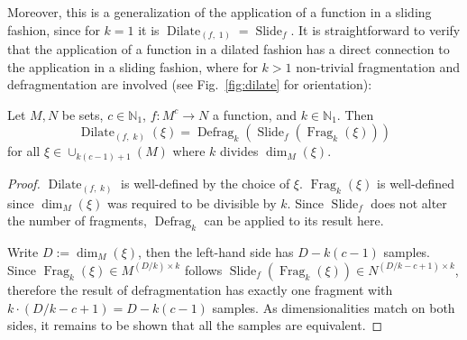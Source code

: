 \documentclass[journal]{IEEEtran}
\newcommand{\N}{\mathbb{N}}
\DeclareMathOperator{\Slide}{Slide}
\DeclareMathOperator{\Fragmentation}{Frag}
\DeclareMathOperator{\Defragmentation}{Defrag}
\DeclareMathOperator{\Dilate}{Dilate}
\begin{document}
Moreover, this is a generalization of the application of a function in a sliding fashion, since for $k = 1$ it is $\Dilate_{(f,\; 1)} = \Slide_f$.
It is straightforward to verify that the application of a function in a dilated fashion has a direct connection to the application in a sliding fashion, where for $k > 1$ non-trivial fragmentation and defragmentation are involved (see Fig.~\ref{fig:dilate} for orientation):
\begin{remark}
\label{rem:dilated-fragment}
Let $M,N$ be sets, $c\in\N_1$, $f\colon M^c\to N$ a function, and $k\in\N_1$.
Then
\begin{displaymath}
  \Dilate_{(f,\; k)}(\xi) = \Defragmentation_k(\Slide_f(\Fragmentation_k(\xi)))
\end{displaymath}
for all $\xi\in\cup_{k(c - 1) + 1}(M)$ where $k$ divides $\dim_M(\xi)$.
\end{remark}\begin{proof}
$\Dilate_{(f,\; k)}$ is well-defined by the choice of $\xi$.
$\Fragmentation_k(\xi)$ is well-defined since $\dim_M(\xi)$ was required to be divisible by $k$.
Since $\Slide_f$ does not alter the number of fragments, $\Defragmentation_k$ can be applied to its result here.

Write $D := \dim_M(\xi)$, then the left-hand side has $D - k(c - 1)$ samples.
Since $\Fragmentation_k(\xi)\in M^{(D/k)\times k}$ follows $\Slide_f(\Fragmentation_k(\xi))\in N^{(D/k - c + 1)\times k}$, therefore the result of defragmentation has exactly one fragment with $k\cdot (D/k - c + 1) = D - k(c - 1)$ samples.
As dimensionalities match on both sides, it remains to be shown that all the samples are equivalent.


\end{proof}
\end{document}
